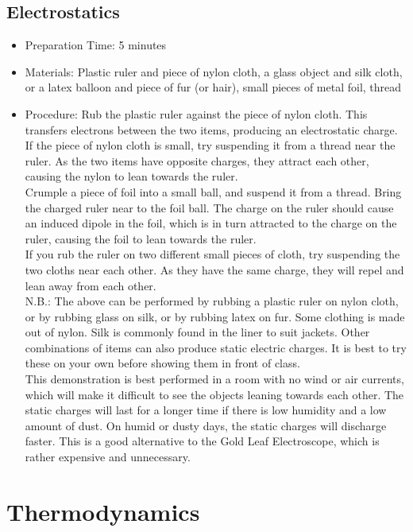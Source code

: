 \subsection{Electrostatics}
\begin{itemize}
\item{Preparation Time: 5 minutes}
\item{Materials: Plastic ruler and piece of nylon cloth, a glass object and silk cloth, or a latex balloon and piece of fur (or hair), small pieces of metal foil, thread}
\item{Procedure: Rub the plastic ruler against the piece of nylon cloth. This transfers electrons between the two items, producing an electrostatic charge. If the piece of nylon cloth is small, try suspending it from a thread near the ruler. As the two items have opposite charges, they attract each other, causing the nylon to lean towards the ruler.\\
Crumple a piece of foil into a small ball, and suspend it from a thread. Bring the charged ruler near to the foil ball. The charge on the ruler should cause an induced dipole in the foil, which is in turn attracted to the charge on the ruler, causing the foil to lean towards the ruler.\\
If you rub the ruler on two different small pieces of cloth, try suspending the two cloths near each other. As they have the same charge, they will repel and lean away from each other.\\
N.B.: The above can be performed by rubbing a plastic ruler on nylon cloth, or by rubbing glass on silk, or by rubbing latex on fur. Some clothing is made out of nylon. Silk is commonly found in the liner to suit jackets. Other combinations of items can also produce static electric charges. It is best to try these on your own before showing them in front of class.\\
This demonstration is best performed in a room with no wind or air currents, which will make it difficult to see the objects leaning towards each other. The static charges will last for a longer time if there is low humidity and a low amount of dust. On humid or dusty days, the static charges will discharge faster. This is a good alternative to the Gold Leaf Electroscope, which is rather expensive and unnecessary.}
\end{itemize}

\section{Thermodynamics}

